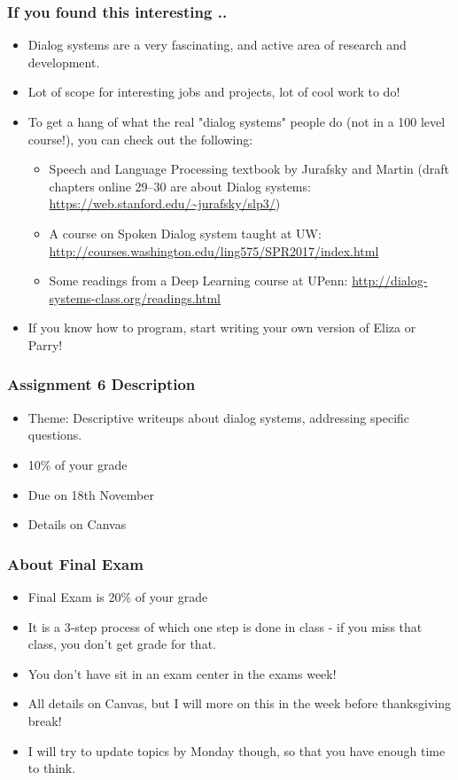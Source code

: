 \documentclass{beamer}
\begin{document}
\begin{frame}
\frametitle{If you found this interesting ..}
\begin{itemize}
\item Dialog systems are a very fascinating, and active area of research and development.
\item Lot of scope for interesting jobs and projects, lot of cool work to do! \pause
\item To get a hang of what the real "dialog systems" people do (not in a 100 level course!), you can check out the following:
\begin{itemize}
\item Speech and Language Processing textbook by Jurafsky and Martin (draft chapters online 29--30 are about Dialog systems: \url{https://web.stanford.edu/~jurafsky/slp3/})
\item A course on Spoken Dialog system taught at UW: \url{http://courses.washington.edu/ling575/SPR2017/index.html} 
\item Some readings from a Deep Learning course at UPenn: \url{http://dialog-systems-class.org/readings.html}
\end{itemize} \pause
\item If you know how to program, start writing your own version of Eliza or Parry! 
\end{itemize}
\end{frame}

\begin{frame}
\frametitle{Assignment 6 Description}
\begin{itemize}
\item Theme: Descriptive writeups about dialog systems, addressing specific questions.
\item 10\% of your grade
\item Due on 18th November
\item Details on Canvas
\end{itemize}
\end{frame}

\begin{frame}
\frametitle{About Final Exam}
\begin{itemize}
\item Final Exam is 20\% of your grade
\item It is a 3-step process of which one step is done in class - if you miss that class, you don't get grade for that.
\item You don't have sit in an exam center in the exams week!
\item All details on Canvas, but I will more on this in the week before thanksgiving break!
\item I will try to update topics by Monday though, so that you have enough time to think.
\end{itemize}
\end{frame}
\end{document}
